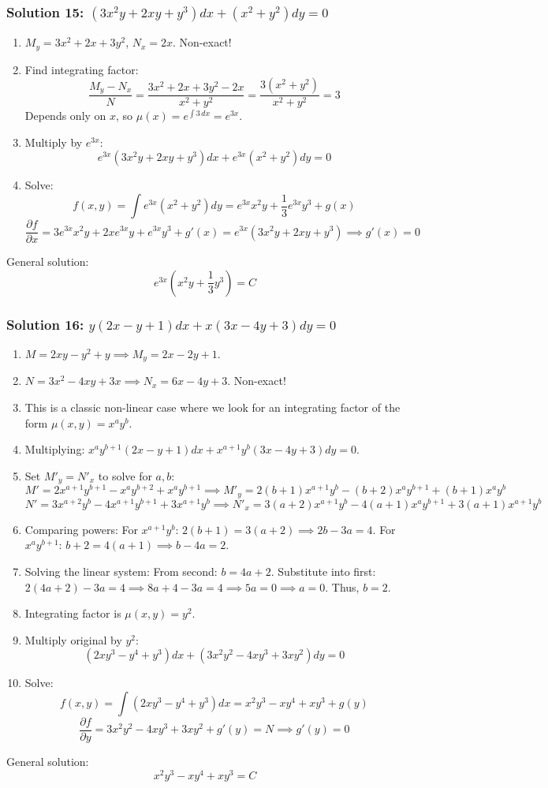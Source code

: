 \documentclass[11pt,letterpaper]{article}
\begin{document}
\subsubsection*{Solution 15: $\left(3x^2y + 2xy + y^3\right)dx + \left(x^2 + y^2\right)dy = 0$}
\begin{enumerate}
    \item $M_y = 3x^2 + 2x + 3y^2$, $N_x = 2x$. Non-exact!
    \item Find integrating factor:
    \[ \frac{M_y - N_x}{N} = \frac{3x^2 + 2x + 3y^2 - 2x}{x^2 + y^2} = \frac{3(x^2+y^2)}{x^2+y^2} = 3 \]
    Depends only on $x$, so $\mu(x) = e^{\int 3 \, dx} = e^{3x}$.
    \item Multiply by $e^{3x}$:
    \[ e^{3x}\left(3x^2y + 2xy + y^3\right)dx + e^{3x}\left(x^2 + y^2\right)dy = 0 \]
    \item Solve:
    \[ f(x,y) = \int e^{3x}(x^2+y^2) dy = e^{3x}x^2y + \frac{1}{3}e^{3x}y^3 + g(x) \]
    \[ \frac{\partial f}{\partial x} = 3e^{3x}x^2y + 2xe^{3x}y + e^{3x}y^3 + g'(x) = e^{3x}\left(3x^2y + 2xy + y^3\right) \implies g'(x) = 0 \]
\end{enumerate}
General solution:
\[ e^{3x}\left(x^2y + \frac{1}{3}y^3\right) = C \]

\subsubsection*{Solution 16: $y(2x-y+1)dx + x(3x-4y+3)dy = 0$}
\begin{enumerate}
    \item $M = 2xy - y^2 + y \implies M_y = 2x - 2y + 1$.
    \item $N = 3x^2 - 4xy + 3x \implies N_x = 6x - 4y + 3$. Non-exact!
    \item This is a classic non-linear case where we look for an integrating factor of the form $\mu(x,y) = x^a y^b$.
    \item Multiplying: $x^a y^{b+1}(2x-y+1)dx + x^{a+1} y^b(3x-4y+3)dy = 0$.
    \item Set $M'_y = N'_x$ to solve for $a, b$:
    \[ M' = 2x^{a+1}y^{b+1} - x^a y^{b+2} + x^a y^{b+1} \implies M'_y = 2(b+1)x^{a+1}y^b - (b+2)x^a y^{b+1} + (b+1)x^a y^b \]
    \[ N' = 3x^{a+2}y^b - 4x^{a+1}y^{b+1} + 3x^{a+1}y^b \implies N'_x = 3(a+2)x^{a+1}y^b - 4(a+1)x^a y^{b+1} + 3(a+1)x^{a+1}y^b \]
    \item Comparing powers:
    For $x^{a+1}y^b$: $2(b+1) = 3(a+2) \implies 2b - 3a = 4$.
    For $x^a y^{b+1}$: $b+2 = 4(a+1) \implies b - 4a = 2$.
    \item Solving the linear system:
    From second: $b = 4a+2$.
    Substitute into first: $2(4a+2) - 3a = 4 \implies 8a + 4 - 3a = 4 \implies 5a = 0 \implies a = 0$.
    Thus, $b = 2$.
    \item Integrating factor is $\mu(x,y) = y^2$.
    \item Multiply original by $y^2$:
    \[ (2xy^3 - y^4 + y^3)dx + (3x^2y^2 - 4xy^3 + 3xy^2)dy = 0 \]
    \item Solve:
    \[ f(x,y) = \int (2xy^3 - y^4 + y^3) dx = x^2 y^3 - x y^4 + x y^3 + g(y) \]
    \[ \frac{\partial f}{\partial y} = 3x^2 y^2 - 4x y^3 + 3x y^2 + g'(y) = N \implies g'(y) = 0 \]
\end{enumerate}
General solution:
\[ x^2 y^3 - x y^4 + x y^3 = C \]
\end{document}

